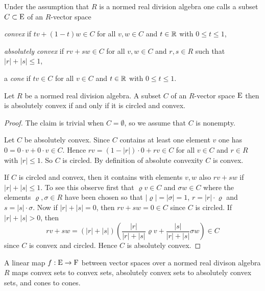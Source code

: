 \begin{definition}
  Under the assumption that $R$ is a normed real division algebra one calls a subset $C\subset \mathrm{E}$ of an $R$-vector space
  \begin{romanlist}
  \item
    \emph{convex} if $tv + (1-t)w \in C$ for all $v,w \in C$ and $t \in \mathbb{R}$ with $0\leq t \leq 1$,
  \item
    \emph{absolutely convex} if $rv + sw \in C$ for all $v,w \in C$ and $r,s \in R$ such that
     $|r|+|s|\leq 1$, 
  \item 
     a \emph{cone} if $tv \in C$ for all $v\in C$ and $t \in \mathbb{R}$ with $0\leq t \leq 1$. 
  \end{romanlist}
\end{definition}

\begin{lemma}
  Let $R$ be a normed real division algebra. A subset $C$ of an
  $R$-vector space $\mathrm{E}$ then is  absolutely convex if and only
  if it is circled and convex.  
\end{lemma}

\begin{proof}
   The claim is trivial when $C=\emptyset$, so we  assume that $C$ is nonempty. 

   Let $C$ be absolutely convex. Since $C$ contains at least one element $v$ 
   one has $0 = 0 \cdot v + 0 \cdot v \in C$. Hence 
   $ rv =  (1-|r|) \cdot 0  + r v \in C$ for all $v\in C$ and $r\in R$ with $|r|\leq 1$.
   So $C$ is circled. By definition of absolute convexity $C$ is convex.

   If $C$ is circled and convex, then it contains with elements $v,w$ also $r v + s w$ 
   if $|r| + |s|\leq 1$. To see this observe first that $\varrho v \in C$ and $\sigma w \in C$  
   where the elements $\varrho,\sigma \in R $ have been chosen so that 
   $|\varrho|=|\sigma|=1$, $r = |r|  \cdot\varrho$ and $s = |s|  \cdot\sigma$. Now if $|r| + |s| =0$, then
   $r v + s w = 0 \in C$ since $C$ is circled. If $|r| + |s| > 0$, then
   \[
    r v + s w = 
    (|r| + |s|) \left( \frac{|r|}{|r|+|s|} \varrho v  +  \frac{|s|}{|r|+|s|} \sigma w\right) \in C
   \]
   since $C$ is convex and circled. Hence $C$ is absolutely convex.
\end{proof}

\begin{lemma}
  A linear map $f:\mathrm{E} \to \mathrm{F}$ between vector spaces over a normed
  real divison algebra $R$ maps convex sets to convex sets,
  absolutely convex sets to absolutely convex sets, and cones to cones.
\end{lemma}

